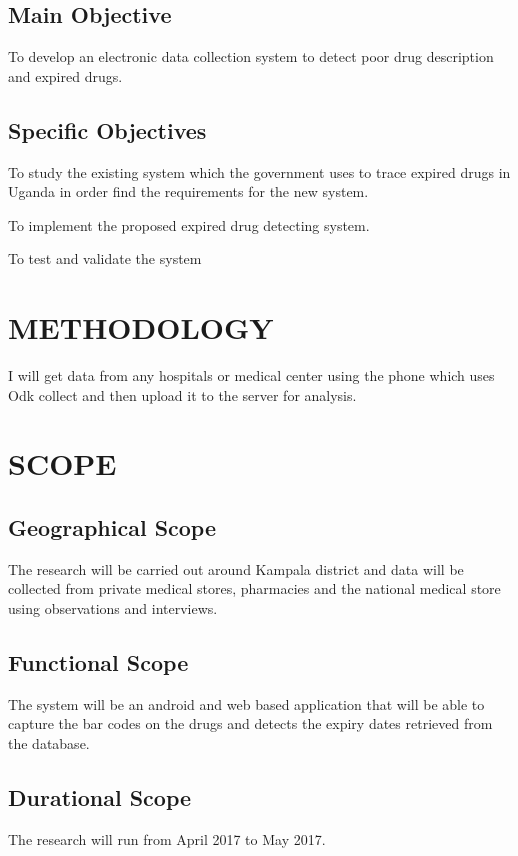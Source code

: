 \documentclass{article}
\begin{document}
\subsection{Main Objective}
To develop an electronic data collection system to detect poor drug description and expired drugs. 

\subsection{Specific Objectives}
To study the existing system which the government uses to trace expired drugs in Uganda in order find the requirements for the new system. 

To implement the proposed expired drug detecting system. 

To test and validate the system

\section{METHODOLOGY}
I will get data from any hospitals or medical center using the phone which uses Odk collect and then upload it to the server for analysis. 
 
\section{SCOPE}
\subsection{Geographical Scope}
The research will be carried out around Kampala district and data will be collected from private medical stores, pharmacies and the national medical store using observations and interviews.

\subsection{Functional Scope}
The system will be an android and web based application that will be able to capture the bar codes on the drugs and detects the expiry dates retrieved from the database.

\subsection{Durational Scope}
The research will run from  April 2017 to May 2017.
\end{document}

